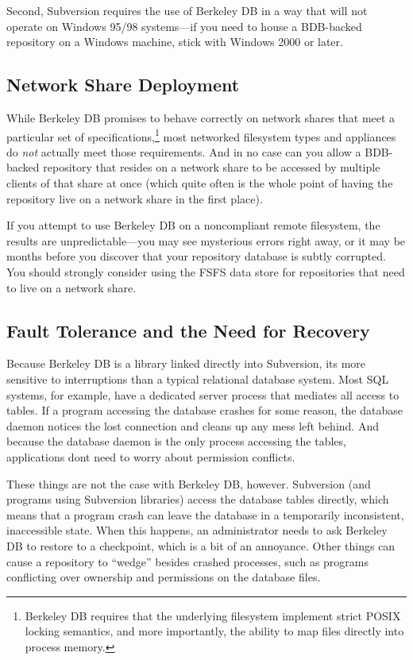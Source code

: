 Second, Subversion requires the use of Berkeley DB in a way that will
not operate on Windows 95/98 systems---if you need to house a BDB-backed
repository on a Windows machine, stick with Windows 2000 or later.

\subsection{Network Share
Deployment}\label{svn.berkeleydb.limitations.sharedfs}

While Berkeley DB promises to behave correctly on network shares that
meet a particular set of specifications,\footnote{Berkeley DB requires
  that the underlying filesystem implement strict POSIX locking
  semantics, and more importantly, the ability to map files directly
  into process memory.} most networked filesystem types and appliances
do \emph{not} actually meet those requirements. And in no case can you
allow a BDB-backed repository that resides on a network share to be
accessed by multiple clients of that share at once (which quite often is
the whole point of having the repository live on a network share in the
first place).

If you attempt to use Berkeley DB on a noncompliant remote filesystem,
the results are unpredictable---you may see mysterious errors right
away, or it may be months before you discover that your repository
database is subtly corrupted. You should strongly consider using the
FSFS data store for repositories that need to live on a network share.

\subsection{Fault Tolerance and the Need for
Recovery}\label{svn.berkeleydb.limitations.faulttolerance}

Because Berkeley DB is a library linked directly into Subversion,
it\textquotesingle s more sensitive to interruptions than a typical
relational database system. Most SQL systems, for example, have a
dedicated server process that mediates all access to tables. If a
program accessing the database crashes for some reason, the database
daemon notices the lost connection and cleans up any mess left behind.
And because the database daemon is the only process accessing the
tables, applications don\textquotesingle t need to worry about
permission conflicts.

These things are not the case with Berkeley DB, however. Subversion (and
programs using Subversion libraries) access the database tables
directly, which means that a program crash can leave the database in a
temporarily inconsistent, inaccessible state. When this happens, an
administrator needs to ask Berkeley DB to restore to a checkpoint, which
is a bit of an annoyance. Other things can cause a repository to
``wedge'' besides crashed processes, such as programs conflicting over
ownership and permissions on the database files.

